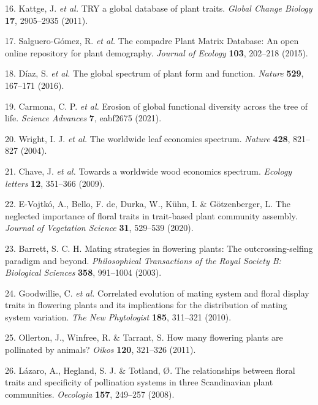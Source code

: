 \documentclass[12pt,a4paper,]{article}
\begin{document}
\hypertarget{ref-kattge2011}{}
16. Kattge, J. \emph{et al.} TRY a global database of plant traits.
\emph{Global Change Biology} \textbf{17}, 2905--2935 (2011).

\hypertarget{ref-salguero2015}{}
17. Salguero-Gómez, R. \emph{et al.} The compadre Plant Matrix Database:
An open online repository for plant demography. \emph{Journal of
Ecology} \textbf{103}, 202--218 (2015).

\hypertarget{ref-diaz2016}{}
18. Díaz, S. \emph{et al.} The global spectrum of plant form and
function. \emph{Nature} \textbf{529}, 167--171 (2016).

\hypertarget{ref-carmona2021}{}
19. Carmona, C. P. \emph{et al.} Erosion of global functional diversity
across the tree of life. \emph{Science Advances} \textbf{7}, eabf2675
(2021).

\hypertarget{ref-wright2004}{}
20. Wright, I. J. \emph{et al.} The worldwide leaf economics spectrum.
\emph{Nature} \textbf{428}, 821--827 (2004).

\hypertarget{ref-chave2009}{}
21. Chave, J. \emph{et al.} Towards a worldwide wood economics spectrum.
\emph{Ecology letters} \textbf{12}, 351--366 (2009).

\hypertarget{ref-evojtko2020}{}
22. E-Vojtkó, A., Bello, F. de, Durka, W., Kühn, I. \& Götzenberger, L.
The neglected importance of floral traits in trait-based plant community
assembly. \emph{Journal of Vegetation Science} \textbf{31}, 529--539
(2020).

\hypertarget{ref-barrett2003}{}
23. Barrett, S. C. H. Mating strategies in flowering plants: The
outcrossing-selfing paradigm and beyond. \emph{Philosophical
Transactions of the Royal Society B: Biological Sciences} \textbf{358},
991--1004 (2003).

\hypertarget{ref-goodwillie2010}{}
24. Goodwillie, C. \emph{et al.} Correlated evolution of mating system
and floral display traits in flowering plants and its implications for
the distribution of mating system variation. \emph{The New Phytologist}
\textbf{185}, 311--321 (2010).

\hypertarget{ref-ollerton2011}{}
25. Ollerton, J., Winfree, R. \& Tarrant, S. How many flowering plants
are pollinated by animals? \emph{Oikos} \textbf{120}, 321--326 (2011).

\hypertarget{ref-lazaro2008}{}
26. Lázaro, A., Hegland, S. J. \& Totland, Ø. The relationships between
floral traits and specificity of pollination systems in three
Scandinavian plant communities. \emph{Oecologia} \textbf{157}, 249--257
(2008).
\end{document}
